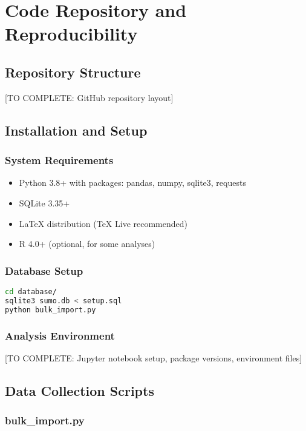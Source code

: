 \chapter{Code Repository and Reproducibility}

\section{Repository Structure}

[TO COMPLETE: GitHub repository layout]

\section{Installation and Setup}

\subsection{System Requirements}

\begin{itemize}
\item Python 3.8+ with packages: pandas, numpy, sqlite3, requests
\item SQLite 3.35+
\item LaTeX distribution (TeX Live recommended)
\item R 4.0+ (optional, for some analyses)
\end{itemize}

\subsection{Database Setup}

\begin{lstlisting}[language=bash]
cd database/
sqlite3 sumo.db < setup.sql
python bulk_import.py
\end{lstlisting}

\subsection{Analysis Environment}

[TO COMPLETE: Jupyter notebook setup, package versions, environment files]

\section{Data Collection Scripts}

\subsection{bulk\_import.py}

